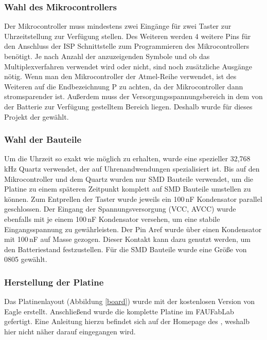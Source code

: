 \subsubsection{Wahl des Mikrocontrollers}
Der Mikrocontroller muss mindestens zwei Eingänge für zwei Taster zur Uhrzeitstellung zur Verfügung stellen. Des Weiteren werden 4 weitere Pins für den Anschluss der ISP Schnittstelle zum Programmieren des Mikrocontrollers benötigt. Je nach Anzahl der anzuzeigenden Symbole und ob das Multiplexverfahren verwendet wird oder nicht,  sind noch zusätzliche Ausgänge nötig. Wenn man den Mikrocontroller der Atmel-Reihe verwendet, ist des Weiteren auf die Endbezeichnung P zu achten, da der Mikrocontroller dann stromsparender ist. Außerdem muss der Versorgungsspannungsbereich in dem von der Batterie zur Verfügung gestelltem Bereich liegen. Deshalb wurde für dieses Projekt der \cite[ATmega88PA]{atmel88pa} gewählt.

\subsubsection{Wahl der Bauteile}
Um die Uhrzeit so exakt wie möglich zu erhalten, wurde eine spezieller 32,768\,kHz Quartz verwendet, der auf Uhrenandwendungen spezialisiert ist. Bis auf den Mikrocontroller und dem Quartz wurden nur SMD Bauteile verwendet, um die Platine zu einem späteren Zeitpunkt komplett auf SMD Bauteile umstellen zu können. Zum Entprellen der Taster wurde jeweils ein 100\,nF Kondensator parallel geschlossen. Der Eingang der Spannungsversorgung (VCC, AVCC) wurde ebenfalls mit je einem 100\,nF Kondensator versehen, um eine stabile Eingangsspannung zu gewährleisten. Der Pin Aref wurde über einen Kondensator mit 100\,nF auf Masse gezogen. Dieser Kontakt kann dazu genutzt werden, um den Batteriestand festzustellen. Für die SMD Bauteile wurde eine Größe von 0805 gewählt.

\subsubsection{Herstellung der Platine}

Das Platinenlayout (Abbildung \ref{board}) wurde mit der kostenlosen Version von Eagle erstellt. Anschließend wurde die komplette Platine im FAUFabLab gefertigt. Eine Anleitung hierzu befindet sich auf der Homepage des \cite[FAUFabLab]{fablabwerkzeuge}, weshalb hier nicht näher darauf eingegangen wird.



